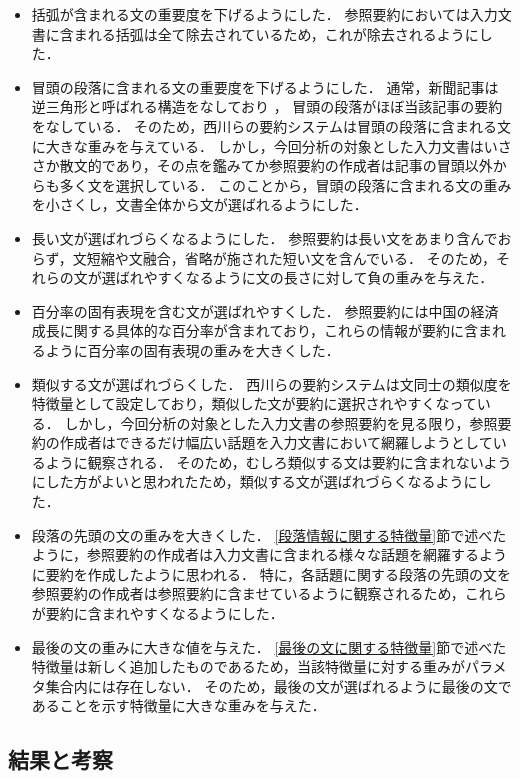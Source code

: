 \begin{itemize}
\item
括弧が含まれる文の重要度を下げるようにした．
参照要約においては入力文書に含まれる括弧は全て除去されているため，これが除去されるようにした．
\item
冒頭の段落に含まれる文の重要度を下げるようにした．
通常，新聞記事は逆三角形と呼ばれる構造をなしており \cite{kyodo10}，
冒頭の段落がほぼ当該記事の要約をなしている．
そのため，西川らの要約システムは冒頭の段落に含まれる文に大きな重みを与えている．
しかし，今回分析の対象とした入力文書はいささか散文的であり，その点を鑑みてか参照要約の作成者は記事の冒頭以外からも多く文を選択している．
このことから，冒頭の段落に含まれる文の重みを小さくし，文書全体から文が選ばれるようにした．
\item
長い文が選ばれづらくなるようにした．
参照要約は長い文をあまり含んでおらず，文短縮や文融合，省略が施された短い文を含んでいる．
そのため，それらの文が選ばれやすくなるように文の長さに対して負の重みを与えた．
\item
百分率の固有表現を含む文が選ばれやすくした．
参照要約には中国の経済成長に関する具体的な百分率が含まれており，これらの情報が要約に含まれるように百分率の固有表現の重みを大きくした．
\item
類似する文が選ばれづらくした．
西川らの要約システムは文同士の類似度を特徴量として設定しており，類似した文が要約に選択されやすくなっている．
しかし，今回分析の対象とした入力文書の参照要約を見る限り，参照要約の作成者はできるだけ幅広い話題を入力文書において網羅しようとしているように観察される．
そのため，むしろ類似する文は要約に含まれないようにした方がよいと思われたため，類似する文が選ばれづらくなるようにした．
\item
段落の先頭の文の重みを大きくした．
\ref{段落情報に関する特徴量}節で述べたように，参照要約の作成者は入力文書に含まれる様々な話題を網羅するように要約を作成したように思われる．
特に，各話題に関する段落の先頭の文を参照要約の作成者は参照要約に含ませているように観察されるため，これらが要約に含まれやすくなるようにした．
\item
最後の文の重みに大きな値を与えた．
\ref{最後の文に関する特徴量}節で述べた特徴量は新しく追加したものであるため，当該特徴量に対する重みがパラメタ集合内には存在しない．
そのため，最後の文が選ばれるように最後の文であることを示す特徴量に大きな重みを与えた．
\end{itemize}


\subsection{結果と考察}
\label{sc:結果と考察}


